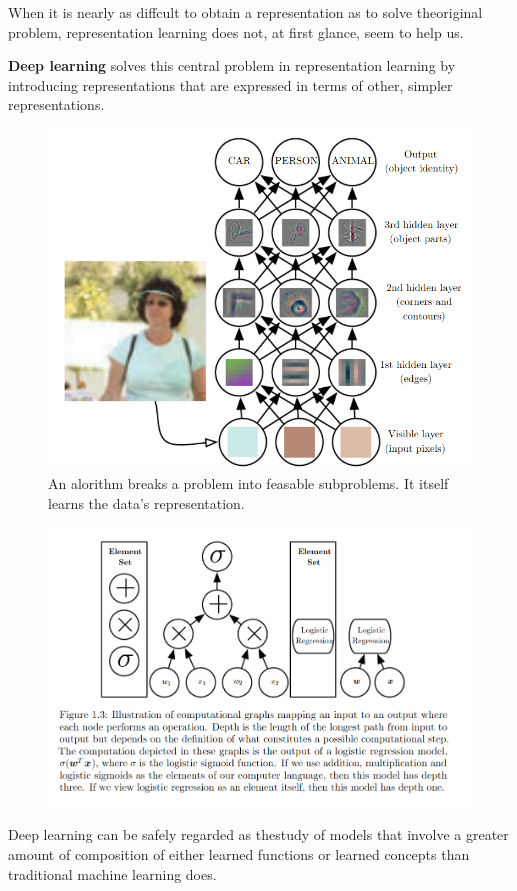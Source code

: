 \documentclass[../Main.tex]{subfiles}
\begin{document}

When it is nearly as diffcult to obtain a representation as to solve theoriginal problem,
representation learning does not, at ﬁrst glance, seem to help us.

\textbf{Deep learning} solves this central problem in representation learning by 
introducing representations that are expressed in terms of other, simpler representations.


\begin{figure}[H]
    \centering
    \includegraphics[width=0.75\linewidth]{Images/multistepalgorithm.png}
    \caption{An alorithm breaks a problem into feasable subproblems. It itself learns the data's representation.}
\end{figure}

\begin{figure}[H]
    \centering
    \includegraphics[width=0.75\linewidth]{Images/computational-depth.png}
\end{figure}

Deep learning can be safely regarded as thestudy of models that involve a greater amount of composition 
of either learned functions or learned concepts than traditional machine learning does.
\end{document}
